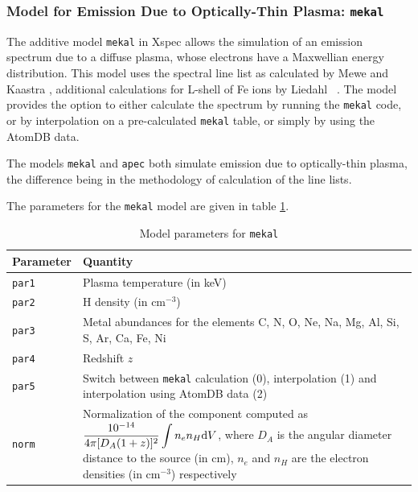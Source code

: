 			\subsubsection{Model for Emission Due to Optically-Thin Plasma: \texttt{mekal}}
				The additive model \texttt{mekal} in Xspec allows the simulation of an emission spectrum due to a diffuse plasma, whose electrons have a Maxwellian energy distribution. This model uses the spectral line list as calculated by Mewe and Kaastra \cite{meka}, additional calculations for L-shell of Fe ions by Liedahl \etal\ \cite{liedahl}. The model provides the option to either calculate the spectrum by running the \texttt{mekal} code, or by interpolation on a pre-calculated \texttt{mekal} table, or simply by using the AtomDB data.
				
				The models \texttt{mekal} and \texttt{apec} both simulate emission due to optically-thin plasma, the difference being in the methodology of calculation of the line lists.
				
				The parameters for the \texttt{mekal} model are given in table \ref{param:mekal}.
				\begin{table}[h!]
					\centering
					\caption{Model parameters for \texttt{mekal}}
					\label{param:mekal}
					\begin{tabular}{p{}p{}}
						\hline
						\textbf{Parameter} & \textbf{Quantity} \\ \hline
						{\texttt{par1}} & {Plasma temperature (in keV)} \\ %
						{\texttt{par2}} & {H density (in cm$^{-3}$)} \\ %
						{\texttt{par3}} & {Metal abundances for the elements C, N, O, Ne, Na, Mg, Al, Si, S, Ar, Ca, Fe, Ni} \\ %
						{\texttt{par4}} & {Redshift $z$} \\ %
						{\texttt{par5}} & {Switch between \texttt{mekal} calculation (0), interpolation (1) and interpolation using AtomDB data (2)} \\ %
						{\texttt{norm}} & {Normalization of the component computed as $\displaystyle\dfrac{10^{-14}}{4\pi[D_A(1+z)]^2}\int{n_en_H\mathrm{d}V}$, where $D_A$ is the angular diameter distance to the source (in cm), $n_e$ and $n_H$ are the electron densities (in cm$^{-3}$) respectively} \\ \hline
					\end{tabular}
				\end{table}
			
